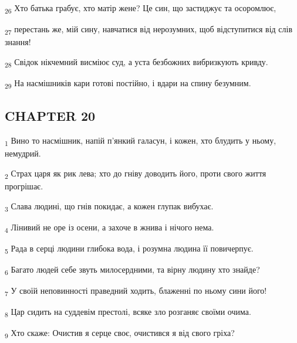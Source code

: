 \begin{tcolorbox}
\textsubscript{26} Хто батька грабує, хто матір жене? Це син, що застиджує та осоромлює,
\end{tcolorbox}
\begin{tcolorbox}
\textsubscript{27} перестань же, мій сину, навчатися від нерозумних, щоб відступитися від слів знання!
\end{tcolorbox}
\begin{tcolorbox}
\textsubscript{28} Свідок нікчемний висміює суд, а уста безбожних вибризкують кривду.
\end{tcolorbox}
\begin{tcolorbox}
\textsubscript{29} На насмішників кари готові постійно, і вдари на спину безумним.
\end{tcolorbox}
\subsection{CHAPTER 20}
\begin{tcolorbox}
\textsubscript{1} Вино то насмішник, напій п'янкий галасун, і кожен, хто блудить у ньому, немудрий.
\end{tcolorbox}
\begin{tcolorbox}
\textsubscript{2} Страх царя як рик лева; хто до гніву доводить його, проти свого життя прогрішає.
\end{tcolorbox}
\begin{tcolorbox}
\textsubscript{3} Слава людині, що гнів покидає, а кожен глупак вибухає.
\end{tcolorbox}
\begin{tcolorbox}
\textsubscript{4} Лінивий не оре із осени, а захоче в жнива і нічого нема.
\end{tcolorbox}
\begin{tcolorbox}
\textsubscript{5} Рада в серці людини глибока вода, і розумна людина її повичерпує.
\end{tcolorbox}
\begin{tcolorbox}
\textsubscript{6} Багато людей себе звуть милосердними, та вірну людину хто знайде?
\end{tcolorbox}
\begin{tcolorbox}
\textsubscript{7} У своїй неповинності праведний ходить, блаженні по ньому сини його!
\end{tcolorbox}
\begin{tcolorbox}
\textsubscript{8} Цар сидить на суддевім престолі, всяке зло розганяє своїми очима.
\end{tcolorbox}
\begin{tcolorbox}
\textsubscript{9} Хто скаже: Очистив я серце своє, очистився я від свого гріха?
\end{tcolorbox}
